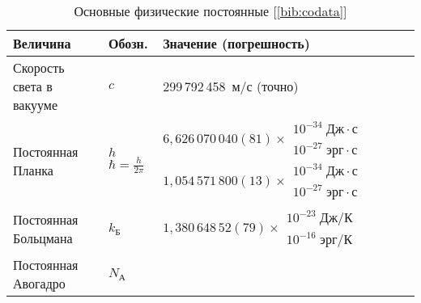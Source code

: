 \newcommand*{\z}{\phantom{0}}
\newcommand*{\zz}{\phantom{00}}

\pagestyle{empty}
\begin{labsupplement}
\begin{longtable}{p{46mm}>{\centering}p{14mm}p{45mm}}
\caption{Основные физические постоянные [\ref{bib:codata}]}\\
\toprule[1pt]
\textbf{Величина}     & \textbf{Обозн.} & \textbf{Значение (погрешность)} \\
\midrule[1pt]
Скорость света в вакууме
                      & $c$
                      & 299\,792\,458~м/с (точно)                         \\
Постоянная Планка     & \hfil$h$\newline \newline
                        $\hbar=\frac{h}{2\pi}$
                      & $6,626\,070\,040(81)\times \!\!
                            \begin{array}{l}
                                10^{-34}\;Дж\cdot с \\[-2pt]
                                10^{-27}\;эрг\cdot с
                            \end{array} $ \newline
                        $1,054\,571\,800(13)\times \!\!
                            \begin{array}{l}
                                10^{-34}\;Дж\cdot с \\[-2pt]
                                10^{-27}\;эрг\cdot с
                            \end{array}$                                 \\
Постоянная Больцмана  & $k_{Б}$
                      & $1,380\,648\,52(79)\times \!\!
                        \begin{array}{l}
                            10^{-23}\;Дж/К \\[-2pt]
                            10^{-16}\;эрг/К
                        \end{array}$                                    \\
Постоянная Авогадро   & $N_{А}$

\end{longtable}
\end{labsupplement}
